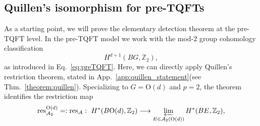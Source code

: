 \documentclass[aps,prx,reprint,superscriptaddress,twocolumn,amsmath,amssymb,amsfonts, nofootinbib]{revtex4-2}
\newcommand{\res}{\text{res}}
\theoremstyle{apsstyle}
\begin{document}
\subsection{Quillen's isomorphism for pre-TQFTs}
\label{sec:preTQFT_Quillen}
As a starting point, we will prove the elementary detection theorem at the pre-TQFT level. In the pre-TQFT model we work with the mod-$2$ group cohomology classification 
\begin{equation*}
  H^{d+1}(BG,\mathbb Z_{2}),
\end{equation*}
as introduced in Eq.~\ref{eq:preTQFT}. 
Here, we can directly apply Quillen's restriction theorem, stated in App.~\ref{app:quillen_statement}(see Thm.~\ref{theorem:quillen}).
Specializing to $G=\mathrm{O}(d)$ and $p=2$, the theorem identifies the restriction map
\begin{equation}
\res^{\mathrm{O}(d)}_{\mathcal{A}_{2}}=:\res_{\mathcal A}:\ H^{*}(B\mathrm{O}(d),\mathbb Z_{2})
  \longrightarrow
  \varprojlim_{E\in\mathcal A_{2}(\mathrm{O}(d))} H^{*}(BE,\mathbb Z_{2}),
  \label{eq:quillen_mod2}
\end{equation}
\end{document}
